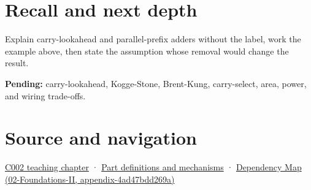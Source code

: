 \section{Recall and next depth}\label{appendix-b5c46b2d94ff-recall-and-next-depth}

Explain carry-lookahead and parallel-prefix adders without the label, work the example above, then state the assumption whose removal would change the result.

\textbf{Pending:} carry-lookahead, Kogge-Stone, Brent-Kung, carry-select, area, power, and wiring trade-offs.

\section{Source and navigation}\label{appendix-b5c46b2d94ff-source-and-navigation}

\href{Continuous\%20Notes/Computing\%20Foundations\%20-\%20From\%20Bits\%20to\%20C++\%20and\%20Systems\%20APIs\#Arithmetic\%20becomes\%20a\%20policy}{C002 teaching chapter} · \hyperref[appendix-fd090d982a15]{Part definitions and mechanisms} · \href{../02-Foundations-II/main.pdf\#nameddest=appendix-4ad47bdd269a}{Dependency Map (02-Foundations-II, appendix-4ad47bdd269a)}
